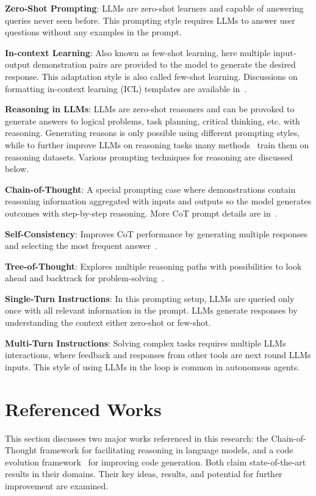 \documentclass[a4paper,oneside]{book}
\begin{document}
\textbf{Zero-Shot Prompting}: LLMs are zero-shot learners and capable of answering queries never seen before. This prompting style requires LLMs to answer user questions without any examples in the prompt.

\textbf{In-context Learning}: Also known as few-shot learning, here multiple input-output demonstration pairs are provided to the model to generate the desired response. This adaptation style is also called few-shot learning. Discussions on formatting in-context learning (ICL) templates are available in~\cite{dong2022survey, zhao2023survey, wang2022super, chung2022scaling}.

\textbf{Reasoning in LLMs}: LLMs are zero-shot reasoners and can be provoked to generate answers to logical problems, task planning, critical thinking, etc. with reasoning. Generating reasons is only possible using different prompting styles, while to further improve LLMs on reasoning tasks many methods~\cite{chung2022scaling, iyer2022opt} train them on reasoning datasets. Various prompting techniques for reasoning are discussed below.

\textbf{Chain-of-Thought}: A special prompting case where demonstrations contain reasoning information aggregated with inputs and outputs so the model generates outcomes with step-by-step reasoning. More CoT prompt details are in~\cite{huang2022towards, wei2022chain, kim2023cot}.

\textbf{Self-Consistency}: Improves CoT performance by generating multiple responses and selecting the most frequent answer~\cite{wang2022self}.

\textbf{Tree-of-Thought}: Explores multiple reasoning paths with possibilities to look ahead and backtrack for problem-solving~\cite{yao2023tree}.

\textbf{Single-Turn Instructions}: In this prompting setup, LLMs are queried only once with all relevant information in the prompt. LLMs generate responses by understanding the context either zero-shot or few-shot.

\textbf{Multi-Turn Instructions}: Solving complex tasks requires multiple LLMs interactions, where feedback and responses from other tools are next round LLMs inputs. This style of using LLMs in the loop is common in autonomous agents.

\chapter{Referenced Works}
This section discusses two major works referenced in this research: the Chain-of-Thought framework for facilitating reasoning in language models, and a code evolution framework~\cite{jiang2023selfevolve} for improving code generation. Both claim state-of-the-art results in their domains. Their key ideas, results, and potential for further improvement are examined.
\end{document}
